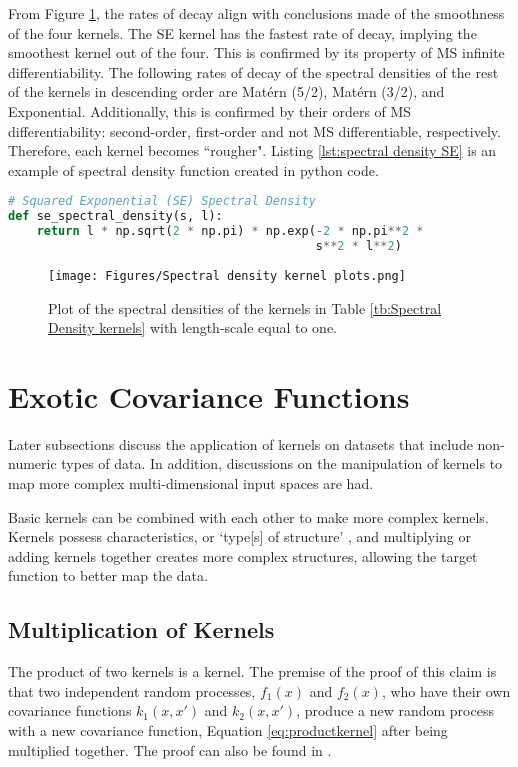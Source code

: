 \documentclass[12pt,a4paper]{article}
\begin{document}
From Figure \ref{fig:Spectral density kernel plot}, the rates of decay align with conclusions made of the smoothness of the four kernels. The SE kernel has the fastest rate of decay, implying the smoothest kernel out of the four. This is confirmed by its property of MS infinite differentiability. The following rates of decay of the spectral densities of the rest of the kernels in descending order are Mat\'{e}rn (5/2), Mat\'{e}rn (3/2),  and Exponential. Additionally, this is confirmed by their orders of MS differentiability: second-order, first-order and not MS differentiable, respectively. Therefore, each kernel becomes ``rougher". Listing \ref{lst:spectral density SE} is an example of spectral density function created in python code.

\vspace{10pt}
\begin{lstlisting}[language=python, caption={Code of SE spectral density.}, label={lst:spectral density SE}]
# Squared Exponential (SE) Spectral Density
def se_spectral_density(s, l):
    return l * np.sqrt(2 * np.pi) * np.exp(-2 * np.pi**2 * 
                                           s**2 * l**2)
\end{lstlisting}

\begin{figure}
\centering
\texttt{[image: Figures/Spectral density kernel plots.png]} 
\caption{Plot of the spectral densities of the kernels in Table \ref{tb:Spectral Density kernels} with length-scale equal to one.} \label{fig:Spectral density kernel plot}
\end{figure}


\newpage
\section{Exotic Covariance Functions}
\label{sec:Exotic kernels}

Later subsections discuss the application of kernels on datasets that include non-numeric types of data. In addition, discussions on the manipulation of kernels to map more complex multi-dimensional input spaces are had.

Basic kernels can be combined with each other to make more complex kernels. Kernels possess characteristics, or `type[s] of structure' \citep[pp.~31]{duvenaud2014automatic}, and multiplying or adding kernels together creates more complex structures, allowing the target function to better map the data.

\subsection{Multiplication of Kernels}
\label{sec:productkernels}
The product of two kernels is a kernel. The premise of the proof of this claim is that two independent random processes, \(f_1(x)\) and \(f_2(x)\), who have their own covariance functions \(k_1(x,x')\) and \(k_2(x,x')\), produce a new random process with a new covariance function, Equation \eqref{eq:productkernel} after being multiplied together. The proof can also be found in \citet[pp.~95]{williams2006gaussian}.
\end{document}
